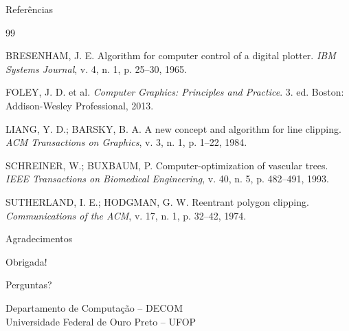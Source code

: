 \documentclass[aspectratio=169,11pt]{beamer}
\begin{document}
\begin{frame}{Referências}
\footnotesize

\begin{thebibliography}{99}

BRESENHAM, J. E.
Algorithm for computer control of a digital plotter.
\textit{IBM Systems Journal}, v. 4, n. 1, p. 25--30, 1965.

FOLEY, J. D. et al.
\textit{Computer Graphics: Principles and Practice}.
3. ed. Boston: Addison-Wesley Professional, 2013.

LIANG, Y. D.; BARSKY, B. A.
A new concept and algorithm for line clipping.
\textit{ACM Transactions on Graphics}, v. 3, n. 1, p. 1--22, 1984.

SCHREINER, W.; BUXBAUM, P.
Computer-optimization of vascular trees.
\textit{IEEE Transactions on Biomedical Engineering},
v. 40, n. 5, p. 482--491, 1993.

SUTHERLAND, I. E.; HODGMAN, G. W.
Reentrant polygon clipping.
\textit{Communications of the ACM}, v. 17, n. 1, p. 32--42, 1974.

\end{thebibliography}
\end{frame}

\begin{frame}{Agradecimentos}
\begin{center}
{\Huge\textcolor{ufopred}{Obrigada!}}

\vspace{0.5cm}

{\Large Perguntas?}

\vspace{0.7cm}

Departamento de Computação -- DECOM\\
Universidade Federal de Ouro Preto -- UFOP
\end{center}
\end{frame}
\end{document}
